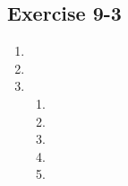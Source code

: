\subsection{Exercise 9-3} %
  \begin{enumerate}[itemsep=8pt, label=\textbf{\arabic*}.]

  \item %

  \item %

\item %
\begin{enumerate}[noitemsep, label=\textbf{(\alph*)} ]
\item %
\item %
\item %
\item %
\item %
\end{enumerate}

  \end{enumerate}



